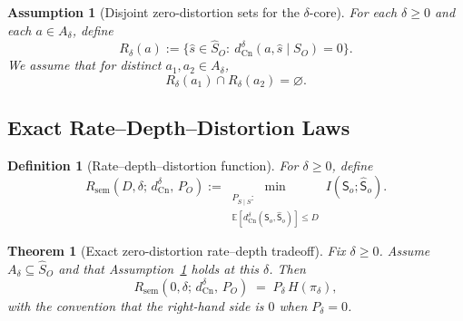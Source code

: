 \documentclass[journal,onecolumn]{IEEEtran}
\newcommand{\Cn}{\text{Cn}}
\newcommand{\E}{\mathbb{E}}
\newtheorem{assumption}{Assumption}[section]
\newtheorem{theorem}{Theorem}[section]
\newtheorem{definition}{Definition}[section]
\numberwithin{equation}{section}
\begin{document}
\begin{assumption}[Disjoint zero-distortion sets for the
\(\delta\)-core]
\label{assump:delta-core-disjoint}
For each \(\delta\ge 0\) and each \(a\in A_\delta\), define
\[
  R_\delta(a)
  :=
  \{\hat s\in\hat S_O:\ d_{\Cn}^{\delta}(a,\hat s\mid S_O)=0\}.
\]
We assume that for distinct \(a_1,a_2\in A_\delta\),
\[
  R_\delta(a_1)\cap R_\delta(a_2)=\varnothing.
\]
\end{assumption}

\subsection{Exact Rate--Depth--Distortion Laws}
\label{subsec:rate-depth-laws}

\begin{definition}[Rate--depth--distortion function]
\label{def:rdd-function}
For \(\delta\ge 0\), define
\begin{equation}\label{eq:rdd-def}
  R_{\mathrm{sem}}(D,\delta;\,d_{\Cn}^{\delta},\,P_O)
  :=
  \min_{\substack{P_{\hat S\mid S}:\\
  \E[d_{\Cn}^{\delta}({\mathsf{S}}_o,\hat {\mathsf{S}}_o)]\le D}}
  I(\mathsf{S}_o;\hat{\mathsf{S}}_o).
\end{equation}
\end{definition}

\begin{theorem}[Exact zero-distortion rate--depth tradeoff]
\label{thm:rate-depth}
Fix \(\delta\ge 0\).
Assume \(A_\delta\subseteq\hat S_O\) and that
Assumption~\ref{assump:delta-core-disjoint} holds at this \(\delta\).
Then
\begin{equation}\label{eq:rate-depth}
  R_{\mathrm{sem}}(0,\delta;\,d_{\Cn}^{\delta},\,P_O)
  \;=\;
  P_\delta\,H(\pi_\delta),
\end{equation}
with the convention that the right-hand side is \(0\) when
\(P_\delta=0\).
\end{theorem}
\end{document}
